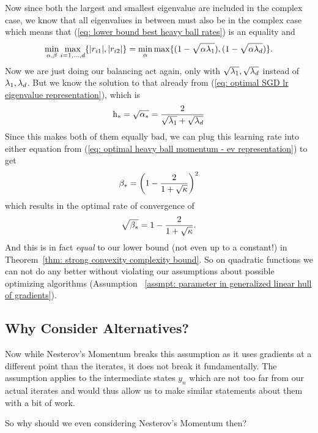 Now since both the largest and smallest eigenvalue are included in the complex
case, we know that all eigenvalues in between must also be in the complex case
which means that (\ref{eq: lower bound best heavy ball rates}) is an equality
and
\begin{align*}
	\min_{\alpha,\beta}\max_{i=1,\dots,d}\{|r_{i1}|,|r_{i2}|\}
	= \min_{\alpha}\max\{(1-\sqrt{\alpha\lambda_1}), (1-\sqrt{\alpha\lambda_d})\}.
\end{align*}
Now we are just doing our balancing act  again, only with 
\(\sqrt{\lambda_1},\sqrt{\lambda_d}\) instead of
\(\lambda_1,\lambda_d\). But we know the solution to that already
from (\ref{eq: optimal SGD lr eigenvalue representation}),
which is
\begin{align*}
	\text{h}_* = \sqrt{\alpha_*} = \frac{2}{\sqrt{\lambda_1}+\sqrt{\lambda_d}}
\end{align*}
%
Since this makes both of them equally bad, we can plug this learning rate into
either equation from (\ref{eq: optimal heavy ball momentum - ev representation})
to get
%
\begin{align*}
	\beta_*=\left(1-\frac{2}{1+\sqrt{\kappa}}\right)^2
\end{align*}
%
which results in the optimal rate of convergence of
%
\begin{align*}
	\sqrt{\beta_*} = 1-\frac{2}{1+\sqrt{\kappa}}.
\end{align*}
%
And this is in fact \emph{equal} to our lower bound (not even up to a constant!) in
Theorem~\ref{thm: strong convexity complexity bound}. So on quadratic functions
we can not do any better without violating our assumptions about possible
optimizing algorithms (Assumption~ \ref{assmpt: parameter in generalized linear
hull of gradients}).

\subsection{Why Consider Alternatives?}

Now while Nesterov's Momentum breaks this assumption as it uses gradients at a
different point than the iterates, it does not break it fundamentally. The
assumption applies to the intermediate states \(y_n\) which are not too far
from our actual iterates and would thus allow us to make similar statements
about them with a bit of work.

So why should we even considering Nesterov's Momentum then?

